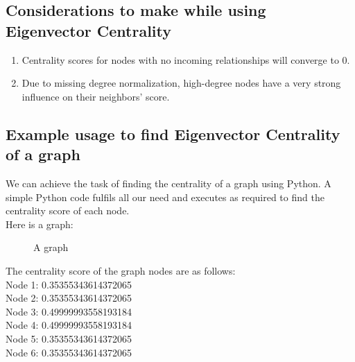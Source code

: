 \documentclass{article}
\begin{document}
    \subsection{Considerations to make while using Eigenvector Centrality}
    \begin{enumerate}
        \item Centrality scores for nodes with no incoming relationships will converge to 0.
        \item Due to missing degree normalization, high-degree nodes have a very strong influence on their neighbors' score.
    \end{enumerate}

    \subsection{Example usage to find Eigenvector Centrality of a graph}
    We can achieve the task of finding the centrality of a graph using Python. A simple Python code fulfils all our need and executes as required to find the centrality score of each node.\\

    \noindent Here is a graph:
    \begin{figure}[ht]
        \centering
            \caption{A graph}
            \label{fig:graph2}
        \end{figure}

    \noindent The centrality score of the graph nodes are as follows: \\
    Node 1: 0.35355343614372065\\
    Node 2: 0.35355343614372065\\
    Node 3: 0.49999993558193184\\
    Node 4: 0.49999993558193184\\
    Node 5: 0.35355343614372065\\
    Node 6: 0.35355343614372065\\
\end{document}
